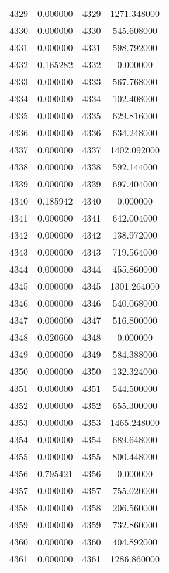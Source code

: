 \documentclass[12pt]{article}
\begin{document}
\begin{longtable}{@{}cccc@{}}
4329 & 0.000000 & 4329 & 1271.348000 \\
4330 & 0.000000 & 4330 & 545.608000 \\
4331 & 0.000000 & 4331 & 598.792000 \\
4332 & 0.165282 & 4332 & 0.000000 \\
4333 & 0.000000 & 4333 & 567.768000 \\
4334 & 0.000000 & 4334 & 102.408000 \\
4335 & 0.000000 & 4335 & 629.816000 \\
4336 & 0.000000 & 4336 & 634.248000 \\
4337 & 0.000000 & 4337 & 1402.092000 \\
4338 & 0.000000 & 4338 & 592.144000 \\
4339 & 0.000000 & 4339 & 697.404000 \\
4340 & 0.185942 & 4340 & 0.000000 \\
4341 & 0.000000 & 4341 & 642.004000 \\
4342 & 0.000000 & 4342 & 138.972000 \\
4343 & 0.000000 & 4343 & 719.564000 \\
4344 & 0.000000 & 4344 & 455.860000 \\
4345 & 0.000000 & 4345 & 1301.264000 \\
4346 & 0.000000 & 4346 & 540.068000 \\
4347 & 0.000000 & 4347 & 516.800000 \\
4348 & 0.020660 & 4348 & 0.000000 \\
4349 & 0.000000 & 4349 & 584.388000 \\
4350 & 0.000000 & 4350 & 132.324000 \\
4351 & 0.000000 & 4351 & 544.500000 \\
4352 & 0.000000 & 4352 & 655.300000 \\
4353 & 0.000000 & 4353 & 1465.248000 \\
4354 & 0.000000 & 4354 & 689.648000 \\
4355 & 0.000000 & 4355 & 800.448000 \\
4356 & 0.795421 & 4356 & 0.000000 \\
4357 & 0.000000 & 4357 & 755.020000 \\
4358 & 0.000000 & 4358 & 206.560000 \\
4359 & 0.000000 & 4359 & 732.860000 \\
4360 & 0.000000 & 4360 & 404.892000 \\
4361 & 0.000000 & 4361 & 1286.860000 \\

\end{longtable}
\end{document}
